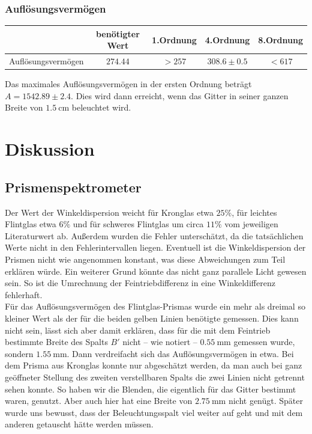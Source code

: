 \documentclass[12pt,a4paper,titlepage,headinclude,bibtotoc]{scrartcl}
\begin{document}
\subsubsection{Auflösungsvermögen}
\begin{table}[!htb]
	\centering
	\begin{tabular}{|c|c|c|c|c|}
		\hline
		& benötigter Wert &1.Ordnung &  4.Ordnung & 8.Ordnung \\
		\hline
	    Auflösungsvermögen & $274.44$ & $>257$ & $308.6 \pm 0.5$ & $<617$ \\
		\hline
	\end{tabular}
\end{table}
Das maximales Auflösungsvermögen in der ersten Ordnung beträgt $A=1542.89 \pm 2.4$.
Dies wird dann erreicht, wenn das Gitter in seiner ganzen Breite von $1.5~$cm beleuchtet wird.

\section{Diskussion}
\label{sec:diskussion}
\subsection{Prismenspektrometer}
Der Wert der Winkeldispersion weicht für Kronglas etwa $25\%$, für leichtes Flintglas etwa $6\%$ und für schweres Flintglas  um circa $11\%$ vom jeweiligen Literaturwert ab.
Außerdem wurden die Fehler unterschätzt, da die tatsächlichen Werte nicht in den Fehlerintervallen liegen.
Eventuell ist die Winkeldispersion der Prismen nicht wie angenommen konstant, was diese Abweichungen zum Teil erklären würde.
Ein weiterer Grund könnte das nicht ganz parallele Licht gewesen sein.
So ist die Umrechnung der Feintriebdifferenz in eine Winkeldifferenz fehlerhaft.\\

Für das Auflösungsvermögen des Flintglas-Prismas wurde ein mehr als dreimal so kleiner Wert als der für die beiden gelben Linien benötigte gemessen.
Dies kann nicht sein, lässt sich aber damit erklären, dass für die mit dem Feintrieb bestimmte Breite des Spalts $B'$ nicht -- wie notiert -- $0.55~$mm gemessen wurde, sondern $1.55~$mm.
Dann verdreifacht sich das Auflösungsvermögen in etwa.
Bei dem Prisma aus Kronglas konnte nur abgeschätzt werden, da man auch bei ganz geöffneter Stellung des zweiten verstellbaren Spalts die zwei Linien nicht getrennt sehen konnte.
So haben wir die Blenden, die eigentlich für das Gitter bestimmt waren, genutzt.
Aber auch hier hat eine Breite von $2.75~$mm nicht genügt.
Später wurde uns bewusst, dass der Beleuchtungsspalt viel weiter auf geht und mit dem anderen getauscht hätte werden müssen.\\
\end{document}
